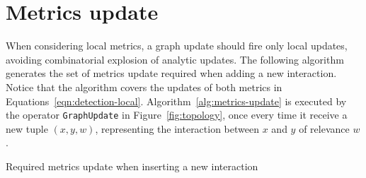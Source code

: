 \section{Metrics update}
\label{sec:metrics-update}

When considering local metrics, a graph update should fire only local updates, avoiding combinatorial explosion of analytic updates.
The following algorithm generates the set of metrics update required when adding a new interaction.
Notice that the algorithm covers the updates of both metrics in Equations~\ref{eqn:detection-local}. 
Algorithm~\ref{alg:metrics-update} is executed by the operator \texttt{GraphUpdate} in Figure~\ref{fig:topology}, once every time it receive a new tuple $(x,y,w)$, representing the interaction between $x$ and $y$ of relevance $w$.

\begin{algorithm}[!ht]
  
   {
  	




  }

  \caption{Required metrics update when inserting a new interaction}
  \label{alg:metrics-update}
\end{algorithm}

